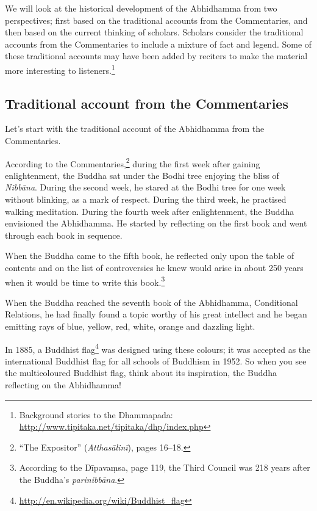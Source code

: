\pagebreak

We will look at the historical development of the Abhidhamma from two perspectives; first based on the traditional accounts from the Commentaries, and then based on the current thinking of scholars. Scholars consider the traditional accounts from the Commentaries to include a mixture of fact and legend. Some of these traditional accounts may have been added by reciters to make the material more interesting to listeners.\footnote{Background stories to the Dhammapada: \url{http://www.tipitaka.net/tipitaka/dhp/index.php}}

\subsection*{Traditional account from the Commentaries}

Let’s start with the traditional account of the Abhidhamma from the Commentaries. 

According to the Commentaries,\footnote{“The Expositor” (\textit{Atthasālinī}), pages 16--18.} during the first week after gaining enlightenment, the Buddha sat under the Bodhi tree enjoying the bliss of \textit{Nibbāna}. During the second week, he stared at the Bodhi tree for one week without blinking, as a mark of respect. During the third week, he practised walking meditation. During the fourth week after enlightenment, the Buddha envisioned the Abhidhamma. He started by reflecting on the first book and went through each book in sequence. 

When the Buddha came to the fifth book, he reflected only upon the table of contents and on the list of controversies he knew would arise in about 250 years when it would be time to write this book.\footnote{According to the Dīpavaṃsa, page 119, the Third Council was 218 years after the Buddha's \textit{parinibbāna}.}

When the Buddha reached the seventh book of the Abhidhamma, Conditional Relations, he had finally found a topic worthy of his great intellect and he began emitting rays of blue, yellow, red, white, orange and dazzling light. 

In 1885, a Buddhist flag\footnote{\url{http://en.wikipedia.org/wiki/Buddhist_flag}} was designed using these colours; it was accepted as the international Buddhist flag for all schools of Buddhism in 1952. So when you see the multicoloured Buddhist flag, think about its inspiration, the Buddha reflecting on the Abhidhamma!

